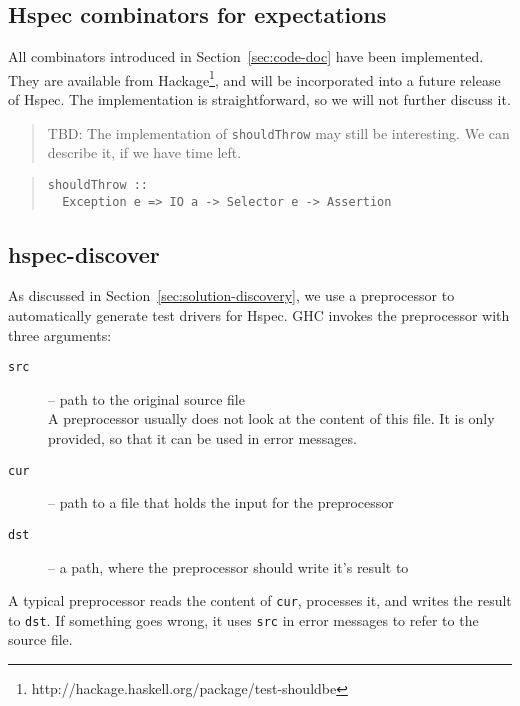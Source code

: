 \documentclass[preprint]{sigplanconf}
\begin{document}

\subsection{Hspec combinators for expectations}
\label{sec:hspec-comb}

\noindent All combinators introduced in Section~\ref{sec:code-doc} have been
implemented.  They are available from Hackage\footnote{%
http://hackage.haskell.org/package/test-shouldbe},
and will be incorporated into a future
release of Hspec.
The implementation is straightforward, so we will not further discuss
it.

\begin{quote}
    TBD: The implementation of \verb|shouldThrow| may still be
    interesting.  We can describe it, if we have time left.
\end{quote}

\begin{quote}
\small
\begin{verbatim}
shouldThrow ::
  Exception e => IO a -> Selector e -> Assertion
\end{verbatim}
\end{quote}

\subsection{hspec-discover}
\label{sec:implementation-discovery}

As discussed in Section~\ref{sec:solution-discovery}, we use a preprocessor to
automatically generate test drivers for Hspec.  GHC invokes the
preprocessor with three arguments:

\begin{description}
    \item[{\tt src}]
        -- path to the original source file\\
        A preprocessor usually does not
        look at the content of this file.  It is only provided, so
        that it can be used in error messages.
    \item[{\tt cur}]
        -- path to a file that holds the input for the preprocessor
    \item[{\tt dst}]
        -- a path, where the preprocessor should write it's result to
\end{description}


\noindent A typical preprocessor reads the content of {\tt cur},
processes it, and writes the result to {\tt dst}.  If something goes
wrong, it uses {\tt src} in error messages to refer to the source
file.
\end{document}
